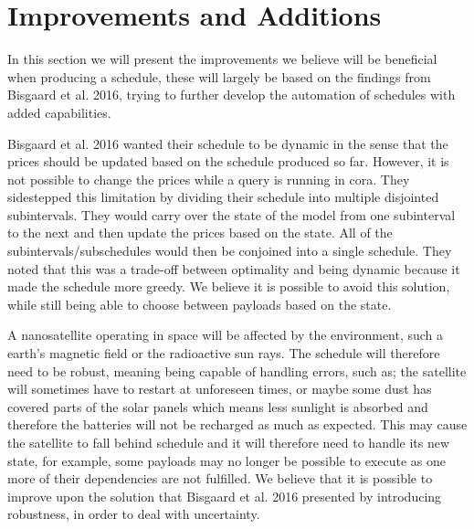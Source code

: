 \section{Improvements and Additions}\label{sec:imp_and_add}
In this section we will present the improvements we believe will be beneficial when producing a schedule, these will largely be based on the findings from Bisgaard et al. 2016\cite{gomx3}, trying to further develop the automation of schedules with added capabilities.

Bisgaard et al. 2016\cite{gomx3} wanted their schedule to be dynamic in the sense that the prices should be updated based on the schedule produced so far.
However, it is not possible to change the prices while a query is running in \gls{cora}.
They sidestepped this limitation by dividing their schedule into multiple disjointed subintervals. 
They would carry over the state of the model from one subinterval to the next and then update the prices based on the state.
All of the subintervals/subschedules would then be conjoined into a single schedule.
They noted that this was a trade-off between optimality and being dynamic because it made the schedule more greedy.
We believe it is possible to avoid this solution, while still being able to choose between payloads based on the state.

A nanosatellite operating in space will be affected by the environment, such a earth's magnetic field or the radioactive sun rays.
The schedule will therefore need to be robust, meaning being capable of handling errors, such as; the satellite will sometimes have to restart at unforeseen times, or maybe some dust has covered parts of the solar panels which means less sunlight is absorbed and therefore the batteries will not be recharged as much as expected.
This may cause the satellite to fall behind schedule and it will therefore need to handle its new state, for example, some payloads may no longer be possible to execute as one more of their dependencies are not fulfilled. 
We believe that it is possible to improve upon the solution that Bisgaard et al. 2016\cite{gomx3} presented by introducing robustness, in order to deal with uncertainty.

